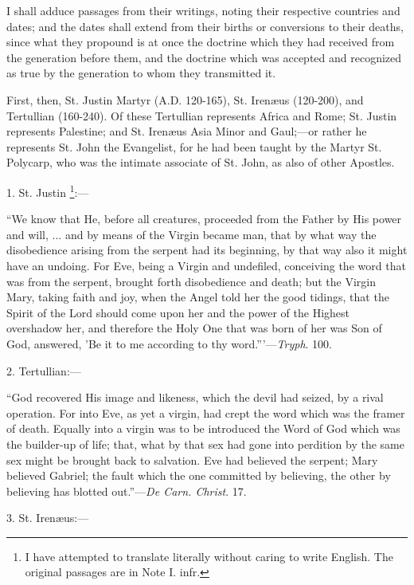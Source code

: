 I shall adduce passages from their writings, noting their respective
countries and dates; and the dates shall extend from their births or
conversions to their deaths, since what they propound is at once
the doctrine which they had received from the generation before them,
and the doctrine which was accepted and recognized as true by the
generation to whom they transmitted it.

First, then, St. Justin Martyr (A.D. 120-165), St.
Irenæus
(120-200), and Tertullian (160-240). Of these Tertullian represents
Africa and Rome; St. Justin represents Palestine; and St. Irenæus Asia
Minor and Gaul;—or rather he represents St. John the Evangelist, for
he had been taught by the Martyr St. Polycarp, who was the intimate
associate of St. John, as also of other Apostles.

1. St. Justin \footnote{I have attempted
to translate literally without caring to write English. The original
passages are in Note I. infr.}:—

``We know that He, before all creatures, proceeded from the Father
by His power and will, ... and by means of the Virgin became man, that
by what way the disobedience arising from the serpent had its beginning,
by that way also it might have an undoing. For Eve, being a Virgin and
undefiled, conceiving the word that was from the serpent, brought forth
disobedience and death; but the Virgin Mary, taking faith and joy, when
the Angel told her the good tidings, that the Spirit of the Lord should
come upon her and the power of the Highest overshadow her, and therefore
the Holy One that was born of her was Son of God, answered, 'Be it to me
according to thy word.'''—\emph{Tryph}. 100.

2. Tertullian:—

``God recovered His image and likeness, which the devil had seized,
by a rival operation. For into Eve, as yet a virgin, had crept the word
which was the framer of death. Equally into a virgin was to be
introduced the Word of God which was the builder-up of life; that, what
by that sex had gone into perdition by the same sex might be brought
back to salvation. Eve had believed the serpent; Mary believed Gabriel;
the fault which the one committed by believing, the other by believing
has blotted out.''—\emph{De Carn. Christ}. 17.

3. St. Irenæus:—

